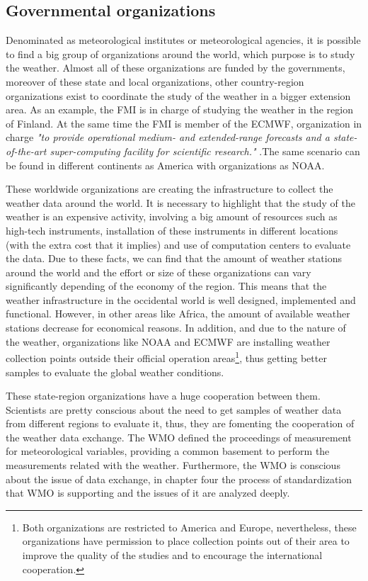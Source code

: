 \subsection{Governmental organizations}

Denominated as meteorological institutes or meteorological agencies, it is possible to find a big group of organizations around the world, which purpose is to study the weather. Almost all of these organizations are funded by the governments, moreover of these state and local organizations, other country-region organizations exist to coordinate the study of the weather in a bigger extension area. As an example, the \gls{FMI}\cite{FMI} is in charge of studying the weather in the region of Finland. At the same time the \gls{FMI} is member of the \gls{ECMWF}\cite{ECMWF}, organization in charge \emph{"to provide operational medium- and extended-range forecasts and a state-of-the-art super-computing facility for scientific research." }.The same scenario can be found in different continents as America with organizations as \gls{NOAA}\cite{NOAA}.

These worldwide organizations are creating the infrastructure to collect the weather data around the world. It is necessary to highlight that the study of the weather is an expensive activity, involving a big amount of resources such as high-tech instruments, installation of these instruments in different locations (with the extra cost that it implies) and use of computation centers to evaluate the data. Due to these facts, we can find that the amount of weather stations around the world and the effort or size of these organizations can vary significantly depending of the economy of the region. This means that the weather infrastructure in the occidental world is well designed, implemented and functional. However, in other areas like Africa, the amount of available weather stations decrease for economical reasons. In addition, and due to the nature of the weather, organizations like \gls{NOAA} and \gls{ECMWF} are installing weather collection points outside their official operation areas\footnote{Both organizations are restricted to America and Europe, nevertheless, these organizations have permission to place collection points out of their area to improve the quality of the studies and to encourage the international cooperation.}, thus getting better samples to evaluate the global weather conditions.

These state-region organizations have a huge cooperation between them. Scientists are pretty conscious about the need to get samples of weather data from different regions to evaluate it, thus, they are fomenting the cooperation of the weather data exchange. The \gls{WMO} defined the proceedings of measurement for meteorological variables\cite{GMIMO}, providing a common basement to perform the measurements related with the weather. Furthermore, the \gls{WMO} is conscious about the issue of data exchange, in chapter four the process of standardization that \gls{WMO} is supporting and the issues of it are analyzed deeply.

